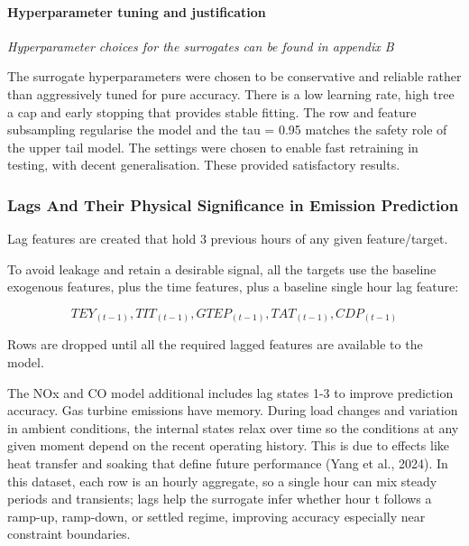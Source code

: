 \documentclass[11pt]{article}
\begin{document}
\paragraph{Hyperparameter tuning and
justification}\label{hyperparameter-tuning-and-justification}

\emph{Hyperparameter choices for the surrogates can be found in appendix
B}

The surrogate hyperparameters were chosen to be conservative and
reliable rather than aggressively tuned for pure accuracy. There is a
low learning rate, high tree a cap and early stopping that provides
stable fitting. The row and feature subsampling regularise the model and
the tau = 0.95 matches the safety role of the upper tail model. The
settings were chosen to enable fast retraining in testing, with decent
generalisation. These provided satisfactory results.

\subsubsection{\texorpdfstring{Lags And Their Physical Significance in
Emission Prediction
}{Lags And Their Physical Significance in Emission Prediction }}\label{lags-and-their-physical-significance-in-emission-prediction}

Lag features are created that hold 3 previous hours of any given
feature/target.

To avoid leakage and retain a desirable signal, all the targets use the
baseline exogenous features, plus the time features, plus a baseline
single hour lag feature:

\[TEY_{(t - 1)},TIT_{(t - 1)},GTEP_{(t - 1)},TAT_{(t - 1)},CDP_{(t - 1)}\]

Rows are dropped until all the required lagged features are available to
the model.

The NOx and CO model additional includes lag states 1-3 to improve
prediction accuracy. Gas turbine emissions have memory. During load
changes and variation in ambient conditions, the internal states relax
over time so the conditions at any given moment depend on the recent
operating history. This is due to effects like heat transfer and soaking
that define future performance (Yang et al., 2024). In this dataset,
each row is an hourly aggregate, so a single hour can mix steady periods
and transients; lags help the surrogate infer whether hour t follows a
ramp-up, ramp-down, or settled regime, improving accuracy especially
near constraint boundaries.
\end{document}
